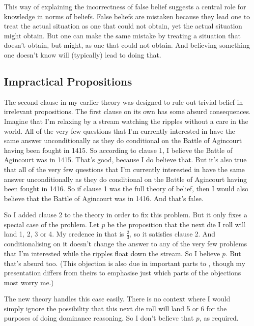 \documentclass[11pt,]{book}
\begin{document}
This way of explaining the incorrectness of false belief suggests a central role for knowledge in norms of beliefs. False beliefs are mistaken because they lead one to treat the actual situation as one that could not obtain, yet the actual situation might obtain. But one can make the same mistake by treating a situation that doesn't obtain, but might, as one that could not obtain. And believing something one doesn't know will (typically) lead to doing that.

\hypertarget{meimpractical}{%
\subsection{Impractical Propositions}\label{meimpractical}}

The second clause in my earlier theory was designed to rule out trivial belief in irrelevant propositions. The first clause on its own has some absurd consequences. Imagine that I'm relaxing by a stream watching the ripples without a care in the world. All of the very few questions that I'm currently interested in have the same answer unconditionally as they do conditional on the Battle of Agincourt having been fought in 1415. So according to clause 1, I believe the Battle of Agincourt was in 1415. That's good, because I do believe that. But it's also true that all of the very few questions that I'm currently interested in have the same answer unconditionally as they do conditional on the Battle of Agincourt having been fought in 1416. So if clause 1 was the full theory of belief, then I would also believe that the Battle of Agincourt was in 1416. And that's false.

So I added clause 2 to the theory in order to fix this problem. But it only fixes a special case of the problem. Let \(p\) be the proposition that the next die I roll will land 1, 2, 3 or 4. My credence in that is \(\frac{2}{3}\), so it satisfies clause 2. And conditionalising on it doesn't change the answer to any of the very few problems that I'm interested while the ripples float down the stream. So I believe \(p\). But that's absurd too. (This objection is also due in important parts to \citet{RossSchroeder2014}, though my presentation differs from theirs to emphasise just which parts of the objections most worry me.)

The new theory handles this case easily. There is no context where I would simply ignore the possibility that this next die roll will land 5 or 6 for the purposes of doing dominance reasoning. So I don't believe that \(p\), as required.
\end{document}
